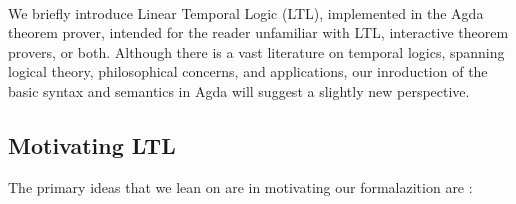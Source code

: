 \documentclass[a4paper, 11pt]{article}
\begin{document}
\begin{code}[hide]
\AgdaSpace{}%
\<%
\\
\>[0]\AgdaSpace{}%
\AgdaSpace{}%
\AgdaSpace{}%
\AgdaSpace{}%
\AgdaSymbol{(}\AgdaSpace{}%
\AgdaSpace{}%
\AgdaSymbol{)}\<%
\\
\>[0]\AgdaSpace{}%
\AgdaSpace{}%
\<%
\\
\>[0]\AgdaSpace{}%
\AgdaSpace{}%
\AgdaSpace{}%
\AgdaSpace{}%
\AgdaSymbol{(}\AgdaSymbol{;}\AgdaSpace{}%
\AgdaSymbol{;}\AgdaSpace{}%
\AgdaOperator{\AgdaInductiveConstructor{\AgdaUnderscore{},\AgdaUnderscore{}}}\AgdaSymbol{;}\AgdaSpace{}%
\AgdaSymbol{;}\AgdaSpace{}%
\AgdaSymbol{;}\AgdaSpace{}%
\AgdaSymbol{;}\AgdaSpace{}%
\AgdaSymbol{;}\AgdaSpace{}%
\AgdaSymbol{)}\<%
\\
\>[0]\AgdaSpace{}%
\AgdaSpace{}%
\<%
\\
%
\\[\AgdaEmptyExtraSkip]%
\>[0]\AgdaSpace{}%
\AgdaSpace{}%
\AgdaSymbol{(}\AgdaSpace{}%
\AgdaSymbol{:}\AgdaSpace{}%
\AgdaSymbol{)}\AgdaSpace{}%
\<%
\end{code}

We briefly introduce Linear Temporal Logic (LTL), implemented in the Agda
theorem prover, intended for the reader unfamiliar with LTL, interactive theorem
provers, or both. Although there is a vast literature on temporal logics,
spanning logical theory, philosophical concerns, and applications, our
inroduction of the basic syntax and semantics in Agda will suggest a slightly
new perspective.

\subsection{Motivating LTL}

The primary ideas that we lean on are in motivating our formalazition are :
\end{document}
